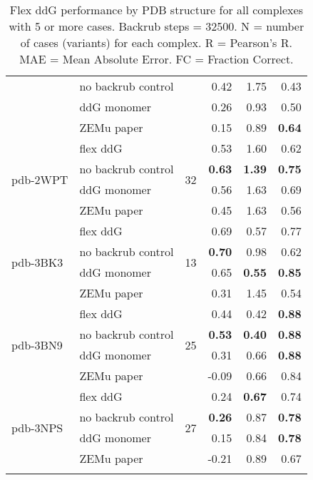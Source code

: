 {\begin{longtable}{llrrrr}
 & no backrub control & & 0.42 & 1.75 & 0.43  \\
 & ddG monomer & & 0.26 & 0.93 & 0.50  \\
 & ZEMu paper & & 0.15 & 0.89 & \textbf{0.64}  \\
\hline
 \multirow{ 4}{*}{pdb-2WPT} & flex ddG & \multirow{ 4}{*}{32} & 0.53 & 1.60 & 0.62  \\
 & no backrub control & & \textbf{0.63} & \textbf{1.39} & \textbf{0.75}  \\
 & ddG monomer & & 0.56 & 1.63 & 0.69  \\
 & ZEMu paper & & 0.45 & 1.63 & 0.56  \\
\hline
 \multirow{ 4}{*}{pdb-3BK3} & flex ddG & \multirow{ 4}{*}{13} & 0.69 & 0.57 & 0.77  \\
 & no backrub control & & \textbf{0.70} & 0.98 & 0.62  \\
 & ddG monomer & & 0.65 & \textbf{0.55} & \textbf{0.85}  \\
 & ZEMu paper & & 0.31 & 1.45 & 0.54  \\
\hline
 \multirow{ 4}{*}{pdb-3BN9} & flex ddG & \multirow{ 4}{*}{25} & 0.44 & 0.42 & \textbf{0.88}  \\
 & no backrub control & & \textbf{0.53} & \textbf{0.40} & \textbf{0.88}  \\
 & ddG monomer & & 0.31 & 0.66 & \textbf{0.88}  \\
 & ZEMu paper & & -0.09 & 0.66 & 0.84  \\
\hline
 \multirow{ 4}{*}{pdb-3NPS} & flex ddG & \multirow{ 4}{*}{27} & 0.24 & \textbf{0.67} & 0.74  \\
 & no backrub control & & \textbf{0.26} & 0.87 & \textbf{0.78}  \\
 & ddG monomer & & 0.15 & 0.84 & \textbf{0.78}  \\
 & ZEMu paper & & -0.21 & 0.89 & 0.67  \\
\bottomrule
  \caption[Flex ddG performance by PDB structure for all complexes with 5 or more cases]{
    Flex ddG performance by PDB structure for all complexes with 5 or more cases. Backrub steps = 32500. N = number of cases (variants) for each complex. R = Pearson's R. MAE = Mean Absolute Error. FC = Fraction Correct.
  } \label{tab:table-by-structure}
\end{longtable}

}